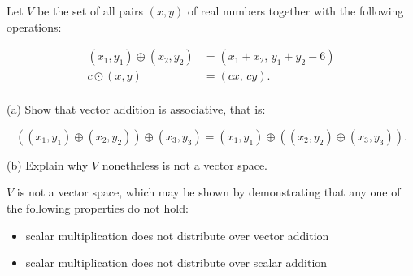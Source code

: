 
\begin{exerciseStatement}


 Let \(V\) be the set of all pairs \((x,y)\) of real numbers together with the following operations: 


\begin{align*} (x_1,y_1)\oplus (x_2,y_2)&= \left(x_{1} + x_{2},\,y_{1} + y_{2} - 6\right)  \\c \odot (x,y) &= \left(c x,\,c y\right) . \\ \end{align*}
            

 (a) Show that vector addition is associative, that is: 

\[\left((x_1,y_1)\oplus(x_2,y_2)\right)\oplus(x_3,y_3)=(x_1,y_1)\oplus\left((x_2,y_2)\oplus(x_3,y_3)\right).
    \]

 (b) Explain why \(V\) nonetheless is not a vector space. 


\end{exerciseStatement}
    
\begin{exerciseAnswer} 


\(V\) is not a vector space, which may be shown by demonstrating that any one of the following properties do not hold: 


\begin{itemize}
\item scalar multiplication does not distribute over vector addition
\item scalar multiplication does not distribute over scalar addition
\end{itemize}
    
\end{exerciseAnswer}
    
